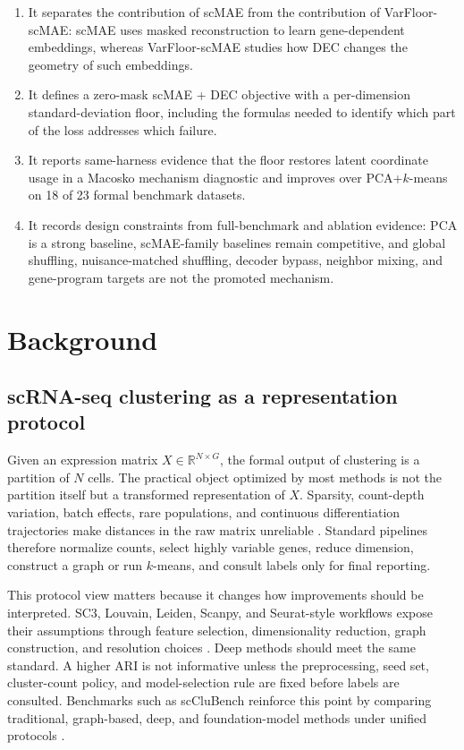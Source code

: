 \documentclass[11pt]{article}
\begin{document}
\begin{enumerate}
  \item It separates the contribution of scMAE from the contribution of VarFloor-scMAE: scMAE uses masked reconstruction to learn gene-dependent embeddings, whereas VarFloor-scMAE studies how DEC changes the geometry of such embeddings.
  \item It defines a zero-mask scMAE + DEC objective with a per-dimension standard-deviation floor, including the formulas needed to identify which part of the loss addresses which failure.
  \item It reports same-harness evidence that the floor restores latent coordinate usage in a Macosko mechanism diagnostic and improves over PCA+$k$-means on 18 of 23 formal benchmark datasets.
  \item It records design constraints from full-benchmark and ablation evidence: PCA is a strong baseline, scMAE-family baselines remain competitive, and global shuffling, nuisance-matched shuffling, decoder bypass, neighbor mixing, and gene-program targets are not the promoted mechanism.
\end{enumerate}

\section{Background}

\subsection{scRNA-seq clustering as a representation protocol}

Given an expression matrix $X \in \mathbb{R}^{N \times G}$, the formal output of clustering is a partition of $N$ cells. The practical object optimized by most methods is not the partition itself but a transformed representation of $X$. Sparsity, count-depth variation, batch effects, rare populations, and continuous differentiation trajectories make distances in the raw matrix unreliable \citep{kiselev2019challenges}. Standard pipelines therefore normalize counts, select highly variable genes, reduce dimension, construct a graph or run $k$-means, and consult labels only for final reporting.

This protocol view matters because it changes how improvements should be interpreted. SC3, Louvain, Leiden, Scanpy, and Seurat-style workflows expose their assumptions through feature selection, dimensionality reduction, graph construction, and resolution choices \citep{kiselev2017sc3,blondel2008louvain,traag2019leiden,wolf2018scanpy,stuart2019seurat}. Deep methods should meet the same standard. A higher ARI is not informative unless the preprocessing, seed set, cluster-count policy, and model-selection rule are fixed before labels are consulted. Benchmarks such as scCluBench reinforce this point by comparing traditional, graph-based, deep, and foundation-model methods under unified protocols \citep{xu2026scclubench}.
\end{document}
